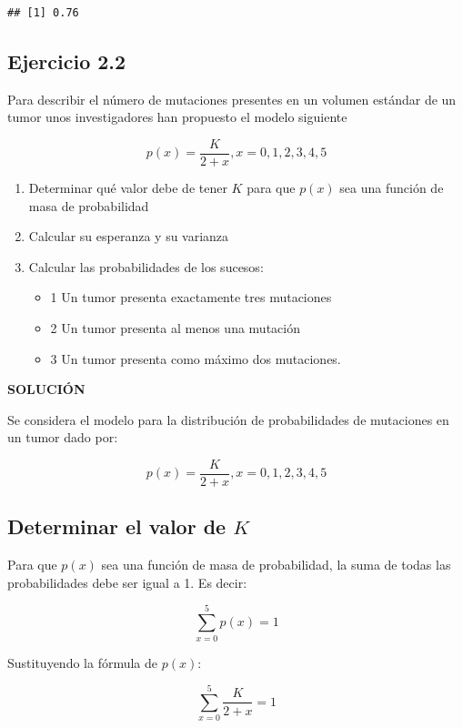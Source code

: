 \documentclass[
]{article}
\providecommand{\tightlist}{%
  \setlength{\itemsep}{0pt}\setlength{\parskip}{0pt}}
\begin{document}
\begin{verbatim}
## [1] 0.76
\end{verbatim}

\subsection{Ejercicio 2.2}\label{ejercicio-2.2}

Para describir el número de mutaciones presentes en un volumen estándar de un tumor unos investigadores han propuesto el modelo siguiente

\[
p(x)=\frac{K}{2+x}, x=0,1,2,3,4,5
\]

\begin{enumerate}
\def\labelenumi{\arabic{enumi}.}
\tightlist
\item
  Determinar qué valor debe de tener \(K\) para que \(p(x)\) sea una función de masa de probabilidad
\item
  Calcular su esperanza y su varianza
\item
  Calcular las probabilidades de los sucesos:

  \begin{itemize}
  \tightlist
  \item
    1 Un tumor presenta exactamente tres mutaciones
  \item
    2 Un tumor presenta al menos una mutación
  \item
    3 Un tumor presenta como máximo dos mutaciones.
  \end{itemize}
\end{enumerate}

\textbf{SOLUCIÓN}

Se considera el modelo para la distribución de probabilidades de mutaciones en un tumor dado por:

\[
p(x)=\frac{K}{2+x}, x=0,1,2,3,4,5
\]

\subsection{\texorpdfstring{Determinar el valor de \(K\)}{Determinar el valor de K}}\label{determinar-el-valor-de-k}

Para que \(p(x)\) sea una función de masa de probabilidad, la suma de todas las probabilidades debe ser igual a 1. Es decir:

\[
\sum_{x=0}^{5} p(x) = 1
\]

Sustituyendo la fórmula de \(p(x)\):

\[
\sum_{x=0}^{5} \frac{K}{2+x} = 1
\]
\end{document}
